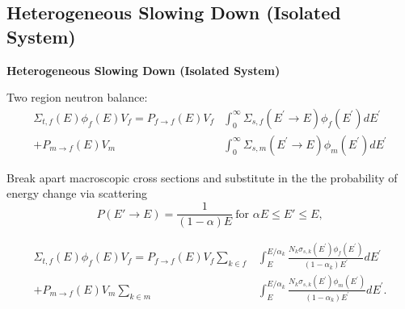 \documentclass{beamer}
\begin{document}
\begin{frame}
  \subsection{Heterogeneous Slowing Down (Isolated System)}
  \textbf{Heterogeneous Slowing Down (Isolated System)}


Two region neutron balance:
\begin{align*}\Sigma_{t,f}(E)\phi_{f}(E)V_{f}=P_{f\rightarrow f}(E)V_{f}&\int_{0}^{\infty}\Sigma_{s,f}\left(E^{\prime}\rightarrow E\right)\phi_{f}\left(E^{\prime}\right)dE^{\prime}\\ + P_{m\rightarrow f}(E)V_{m}&\int_{0}^{\infty}\Sigma_{s,m}\left(E^{\prime}\rightarrow E\right)\phi_{m}\left(E^{\prime}\right)dE^{\prime}\end{align*}

  Break apart macroscopic cross sections and substitute in the the probability of energy change via scattering
\begin{equation*}P(E'\rightarrow E)=\frac{1}{(1-\alpha)E}~\mbox{for }\alpha E\leq E'\leq E,\end{equation*}

\begin{align*}\Sigma_{t,f}(E)\phi_{f}(E)V_{f} = P_{f\rightarrow f}(E)V_{f}\sum\limits_{k\in f}&\int_{E}^{E/\alpha_{k}}\frac{N_{k}\sigma_{s,k}\left(E^{\prime}\right)\phi_{f}\left(E^{\prime}\right)}{\left(1-\alpha_{k}\right)E^{\prime}}dE^{\prime}  \\
+ P_{m\rightarrow f}(E)V_{m}\sum\limits_{k\in m}&\int_{E}^{E/\alpha_{k}}\frac{N_{k}\sigma_{s,k}\left(E^{\prime}\right)\phi_{m}\left(E^{\prime}\right)}{\left(1-\alpha_{k}\right)E^{\prime}}dE^{\prime}.\end{align*}

\end{frame}
\end{document}

